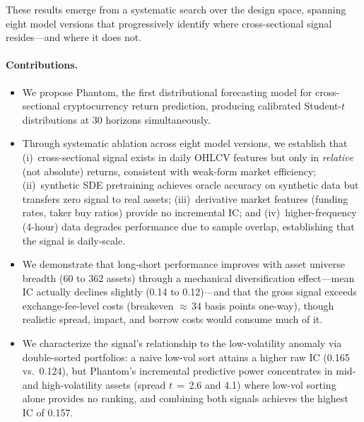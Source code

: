 \documentclass[sigconf]{acmart}
\begin{document}
These results emerge from a systematic search over the design space, spanning eight model versions that progressively identify where cross-sectional signal resides---and where it does not.

\paragraph{Contributions.}
\begin{itemize}
    \item We propose Phantom, the first distributional forecasting model
    for cross-sectional cryptocurrency return prediction, producing
    calibrated Student-$t$ distributions at 30 horizons simultaneously.

    \item Through systematic ablation across eight model versions, we
    establish that (i)~cross-sectional signal exists in daily OHLCV
    features but only in \emph{relative} (not absolute) returns,
    consistent with weak-form market efficiency;
    (ii)~synthetic SDE pretraining achieves oracle accuracy on synthetic
    data but transfers zero signal to real assets;
    (iii)~derivative market features (funding rates, taker buy ratios)
    provide no incremental IC;
    and (iv)~higher-frequency (4-hour) data degrades performance due
    to sample overlap, establishing that the signal is daily-scale.

    \item We demonstrate that long-short performance improves with
    asset universe breadth (60 to 362 assets) through a mechanical
    diversification effect---mean IC actually declines slightly
    (0.14 to 0.12)---and that the gross signal exceeds
    exchange-fee-level costs (breakeven ${\approx}\,34$ basis points
    one-way), though realistic spread, impact, and borrow costs
    would consume much of it.

    \item We characterize the signal's relationship to the
    low-volatility anomaly via double-sorted portfolios: a naive
    low-vol sort attains a higher raw IC (0.165 vs.\ 0.124), but
    Phantom's incremental predictive power concentrates in mid- and
    high-volatility assets (spread $t\,{=}\,$2.6 and 4.1) where
    low-vol sorting alone provides no ranking, and combining both
    signals achieves the highest IC of 0.157.
\end{itemize}
\end{document}
